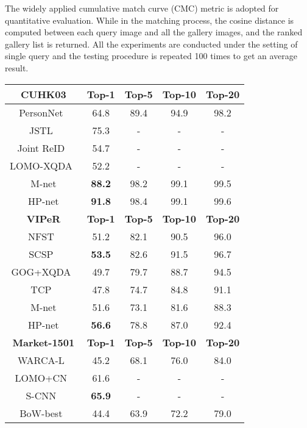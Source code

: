 \documentclass[10pt,twocolumn,letterpaper]{article}
\begin{document}
The widely applied cumulative match curve (CMC) metric is adopted for quantitative evaluation.
%
While in the matching process, the cosine distance is computed between each query image and all the gallery images, and the ranked gallery list is returned.
%
All the experiments are conducted under the setting of single query and the testing procedure is repeated 100 times to get an average result.



\begin{table}[t]
\begin{footnotesize}
\begin{center}
\begin{tabular}{c|cccc}
\hline
\textbf{CUHK03}&\textbf{Top-1}&\textbf{Top-5}&\textbf{Top-10}&\textbf{Top-20}\\\hline
PersonNet~\cite{wu2016personnet} & 64.8 & 89.4 & 94.9 & 98.2 \\
JSTL~\cite{xiao2016learning} & 75.3 & - & - & - \\
Joint ReID~\cite{ahmed2015improved} & 54.7 & - & - & - \\
LOMO-XQDA~\cite{liao2015person} & 52.2 & - & - & - \\\hline
M-net & \textbf{88.2} & 98.2 & 99.1 & 99.5\\
HP-net  & \textbf{91.8} & 98.4 & 99.1 & 99.6\\
\hline
\hline
\textbf{VIPeR}&\textbf{Top-1}&\textbf{Top-5}&\textbf{Top-10}&\textbf{Top-20}\\\hline
NFST~\cite{zhang2016learning} & 51.2 & 82.1 & 90.5 & 96.0\\
SCSP~\cite{chen2016similarity}& \textbf{53.5} & 82.6 & 91.5 & 96.7\\
GOG+XQDA~\cite{matsukawa2016hierarchical} & 49.7 & 79.7 & 88.7 & 94.5 \\
TCP~\cite{cheng2016person} & 47.8 & 74.7 & 84.8 & 91.1 \\\hline
M-net & 51.6 & 73.1 & 81.6 & 88.3\\
HP-net & \textbf{56.6} & 78.8 & 87.0 & 92.4\\
\hline
\hline
\textbf{Market-1501}&\textbf{Top-1}&\textbf{Top-5}&\textbf{Top-10}&\textbf{Top-20}\\\hline
WARCA-L~\cite{jose2016scalable} & 45.2 & 68.1 & 76.0 & 84.0 \\
LOMO+CN~\cite{varior2016siamese} & 61.6 & - & - & - \\
S-CNN~\cite{varior2016gated} & \textbf{65.9} & - & - & - \\
BoW-best~\cite{zheng2015scalable} & 44.4 & 63.9 & 72.2 & 79.0 \\\hline

\end{tabular}
\end{center}
\end{footnotesize}
\end{table}
\end{document}
